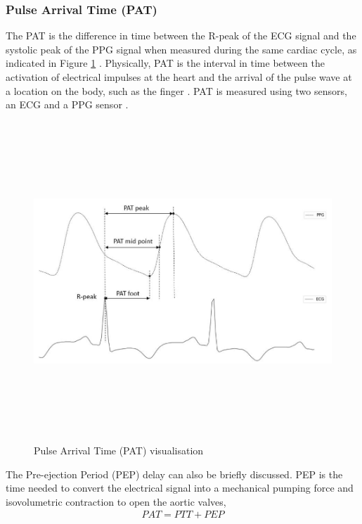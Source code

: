 \subsubsection{Pulse Arrival Time (PAT)} 
The PAT is the difference in time between the R-peak of the ECG signal and 
the systolic peak of the PPG signal when measured during the same 
cardiac cycle, as indicated in 
Figure \ref{pat} \cite{ElHajj2020} \cite{Malikeh2019}. Physically, 
PAT is the interval in time between the activation of electrical 
impulses at the heart and the arrival of the pulse wave at a location 
on the body, such as the finger \cite{Jeong2021}. PAT is measured using 
two sensors, an ECG and a PPG sensor \cite{ElHajj2020}. 
\begin{figure}[H]
    \centering
    \includegraphics[width=12cm,height=12cm,keepaspectratio]{Background/pat.png}
    \caption{Pulse Arrival Time (PAT) visualisation \cite{ElHajj2020}}
    \label{pat}
\end{figure} \noindent The Pre-ejection Period (PEP) delay can 
also be briefly discussed. PEP is the time needed to convert the electrical 
signal into a mechanical pumping force and isovolumetric contraction to open 
the aortic valves, 
\begin{align}
    PAT = PTT + PEP
\end{align}

